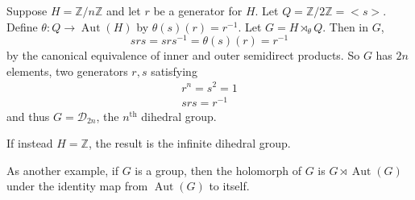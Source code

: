 \documentclass[12pt]{article}
\newcommand{\Z}{\mathbb{Z}}
\newcommand{\Aut}{\operatorname{Aut}}
\newcommand{\semidirect}{\rtimes}
\newcommand{\cD}{\mathcal{D}}
\begin{document}
Suppose $H=\Z/n\Z$ and let $r$ be a generator for $H$. Let $Q=\Z/2\Z=<s>$. Define $\theta:Q\to\Aut(H)$ by $\theta(s)(r)=r^{-1}$. Let $G=H\semidirect_{\theta} Q$. Then in $G$, 
\[srs=srs^{-1}=\theta(s)(r)=r^{-1}\]
by the canonical equivalence of inner and outer semidirect products. So $G$ has $2n$ elements, two generators $r,s$ satisfying
\begin{gather*}
r^n=s^2=1\\
srs=r^{-1}
\end{gather*}
and thus $G=\cD_{2n}$, the $n^{\mathrm{th}}$ dihedral group.

If instead $H=\Z$, the result is the infinite dihedral group.

As another example, if $G$ is a group, then the holomorph of $G$ is $G\semidirect \Aut(G)$ under the identity map from $\Aut(G)$ to itself.
\end{document}
